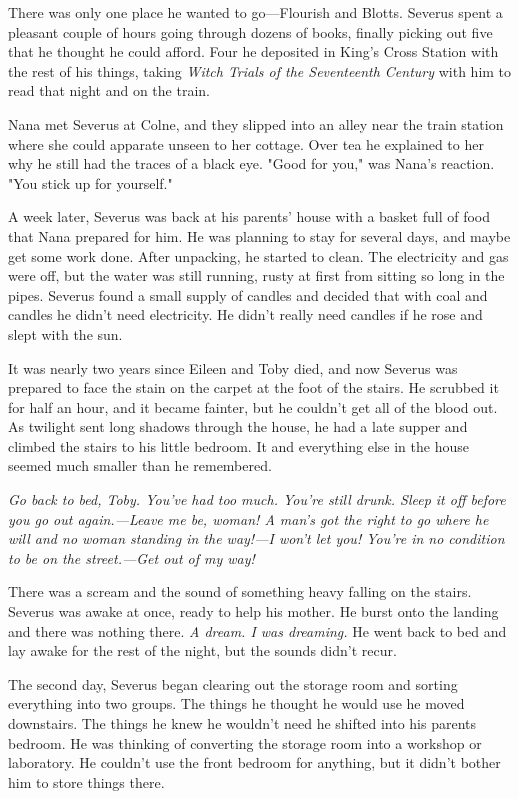 There was only one place he wanted to go—Flourish and Blotts. Severus spent a pleasant couple of hours going through dozens of books, finally picking out five that he thought he could afford. Four he deposited in King's Cross Station with the rest of his things, taking \emph{Witch Trials of the Seventeenth Century} with him to read that night and on the train.

Nana met Severus at Colne, and they slipped into an alley near the train station where she could apparate unseen to her cottage. Over tea he explained to her why he still had the traces of a black eye. "Good for you," was Nana's reaction. "You stick up for yourself."

A week later, Severus was back at his parents' house with a basket full of food that Nana prepared for him. He was planning to stay for several days, and maybe get some work done. After unpacking, he started to clean. The electricity and gas were off, but the water was still running, rusty at first from sitting so long in the pipes. Severus found a small supply of candles and decided that with coal and candles he didn't need electricity. He didn't really need candles if he rose and slept with the sun.

It was nearly two years since Eileen and Toby died, and now Severus was prepared to face the stain on the carpet at the foot of the stairs. He scrubbed it for half an hour, and it became fainter, but he couldn't get all of the blood out. As twilight sent long shadows through the house, he had a late supper and climbed the stairs to his little bedroom. It and everything else in the house seemed much smaller than he remembered.

\emph{Go back to bed, Toby. You've had too much. You're still drunk. Sleep it off before you go out again.—Leave me be, woman! A man's got the right to go where he will and no woman standing in the way!—I won't let you! You're in no condition to be on the street.—Get out of my way!}

There was a scream and the sound of something heavy falling on the stairs. Severus was awake at once, ready to help his mother. He burst onto the landing and{\el} there was nothing there. \emph{A dream. I was dreaming.} He went back to bed and lay awake for the rest of the night, but the sounds didn't recur.

The second day, Severus began clearing out the storage room and sorting everything into two groups. The things he thought he would use he moved downstairs. The things he knew he wouldn't need he shifted into his parents bedroom. He was thinking of converting the storage room into a workshop or laboratory. He couldn't use the front bedroom for anything, but it didn't bother him to store things there.

